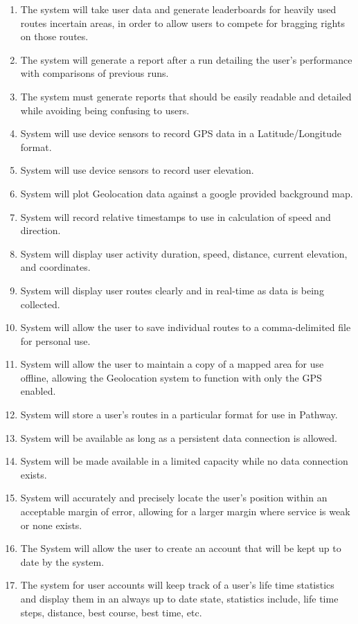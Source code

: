 ﻿\documentclass{article}
\begin{document}
\begin{enumerate}
    \item The system will take user data and generate leaderboards for heavily used routes incertain areas, in order to allow users to compete for bragging rights on those routes.
    \item The system will generate a report after a run detailing the user’s performance with comparisons of previous runs.
    \item The system must generate reports that should be easily readable and detailed while avoiding being confusing to users.
    \item System will use device sensors to record GPS data in a Latitude/Longitude format.
    \item System will use device sensors to record user elevation.
    \item System will plot Geolocation data against a google provided background map.
    \item System will record relative timestamps to use in calculation of speed and direction.
    \item System will display user activity duration, speed, distance, current elevation, and coordinates.
    \item System will display user routes clearly and in real-time as data is being collected.
    \item System will allow the user to save individual routes to a comma-delimited file for personal use.
    \item System will allow the user to maintain a copy of a mapped area for use offline, allowing the Geolocation system to function with only the GPS enabled.
    \item System will store a user’s routes in a particular format for use in Pathway.
    \item System will be available as long as a persistent data connection is allowed.
    \item System will be made available in a limited capacity while no data connection exists.
    \item System will accurately and precisely locate the user’s position within an acceptable margin of error, allowing for a larger margin where service is weak or none exists.
    \item The System will allow the user to create an account that will be kept up to date by the system.
    \item The system for user accounts will keep track of a user's life time statistics and display them in an always up to date state, statistics include, life time steps, distance, best course, best time, etc.

\end{enumerate}
\end{document}
